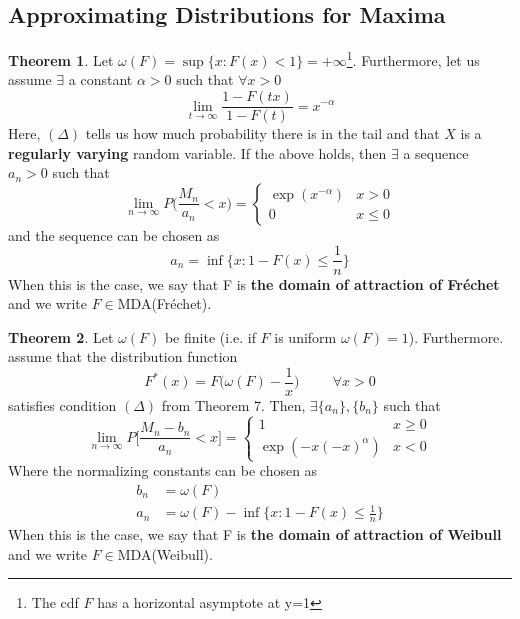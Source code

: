 \documentclass{article}
\theoremstyle{definition}
\newtheorem{theorem}{Theorem}
\theoremstyle{definition}
\def\w{\omega}
\begin{document}
\subsection{Approximating Distributions for Maxima}
\begin{theorem}
Let $\w(F)=\sup\{x:F(x)<1\}=+\infty$\footnote{The cdf $F$ has a horizontal asymptote at y=1}. Furthermore, let us assume $\exists$ a constant $\alpha>0$ such that $\forall x>0$
\[ \lim_{t\rightarrow \infty} \frac{1-F(tx)}{1-F(t)}=x^{-\alpha} \tag{$\Delta$}\]
Here, $(\Delta)$ tells us how much probability there is in the tail and that $X$ is a \textbf{regularly varying} random variable. If the above holds, then $\exists$ a sequence $a_n>0$ such that 
\[\lim_{n \rightarrow \infty} P\bigg( \frac{M_n}{a_n} <x \bigg)= \begin{cases}\exp (x^{-\alpha}) & x>0\\
0 & x\leq 0
\end{cases}\]
and the sequence can be chosen as 
\[ a_n=\inf \bigg\{ x:1-F(x)\leq \frac{1}{n} \bigg\}\]
When this is the case, we say that F is \textbf{the domain of attraction of Fréchet} and we write $F\in $MDA(Fréchet).
\end{theorem}

\begin{theorem}
Let $\w(F)$ be finite (i.e. if $F$ is uniform $\w(F)=1$). Furthermore. assume that the distribution function 
\[F^*(x)=F\bigg(\w(F)-\frac{1}{x}\bigg) \hspace{1cm} \forall x>0 \]
satisfies condition $(\Delta)$ from Theorem 7. Then, $\exists \{a_n\}, \{b_n\}$ such that 
\[\lim_{n\rightarrow \infty}P \bigg[ \frac{M_n-b_n}{a_n} < x\bigg]=\begin{cases}1 & x\geq 0\\
\exp(-x(-x)^\alpha)&x<0
\end{cases}\]
Where the normalizing constants can be chosen as 
\begin{align*}
    b_n&=\w(F)\\
    a_n&=\w(F)- \inf\{x:1-F(x)\leq \frac{1}{n}\}
\end{align*}
When this is the case, we say that F is \textbf{the domain of attraction of Weibull} and we write $F\in $MDA(Weibull).
\end{theorem}
\end{document}

